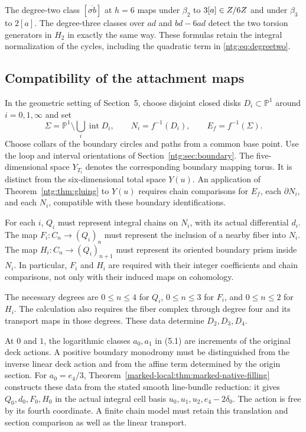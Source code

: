 The degree-two class $[\overline{\sigma b}]$ at
$h=6$ maps under $\beta_2$ to $3[a]\in Z/6Z$ and under
$\beta_3$ to $2[a]$. The degree-three classes over $ad$ and
$bd-6ad$ detect the two torsion generators in $H_2$ in exactly
the same way. These formulas retain the integral normalization of
the cycles, including the quadratic term in \eqref{ntg:eq:degreetwo}.

\subsection{Compatibility of the attachment maps}\label{ntg:sec:remaining}

In the geometric setting of Section~5, choose disjoint closed disks
$D_i\subset\mathbb P^1$ around $i=0,1,\infty$ and set
\[
 \Sigma=\mathbb P^1\setminus\bigcup_i\operatorname{int}D_i,
 \qquad N_i=f^{-1}(D_i),\qquad E_f=f^{-1}(\Sigma).
\]
Choose collars of the boundary circles and paths from a common base point.
Use the loop and interval orientations of Section~\ref{ntg:sec:boundary}.
The five-dimensional space
$Y_{T_i}$ denotes the corresponding boundary mapping torus. It is
distinct from the six-dimensional total space $Y(u)$.
An application of Theorem~\ref{ntg:thm:gluing} to $Y(u)$ requires
chain comparisons for $E_f$, each $\partial N_i$, and each $N_i$,
compatible with these boundary identifications.

For each $i$, $Q_i$ must represent integral chains on $N_i$, with its
actual differential $d_i$. The map $F_i:C_n\to(Q_i)_n$ must represent
the inclusion of a nearby fiber into $N_i$. The map
$H_i:C_n\to(Q_i)_{n+1}$ must represent its oriented boundary prism
inside $N_i$. In particular, $F_i$ and $H_i$ are required with their
integer coefficients and chain comparisons, not only with their induced
maps on cohomology.

The necessary degrees are $0\le n\le4$ for $Q_i$,
$0\le n\le3$ for $F_i$, and $0\le n\le2$ for $H_i$.
The calculation also requires the fiber complex through degree four
and its transport maps in those degrees. These data determine $D_2,D_3,D_4$.

At $0$ and $1$, the logarithmic classes $a_0,a_1$ in (5.1)
are increments of the original deck actions. A positive boundary
monodromy must be distinguished from the inverse linear deck action
and from the affine term determined by the origin section.
For $a_0=e_4/3$, Theorem~\ref{marked-local:thm:marked-native-filling}
constructs these data from the stated smooth line-bundle reduction:
it gives $Q_0,d_0,F_0,H_0$ in the actual integral cell basis
$u_0,u_1,u_2,e_4-2\delta_0$. The action is free by its fourth
coordinate. A finite chain model must retain this translation and
section comparison as well as the linear transport.


